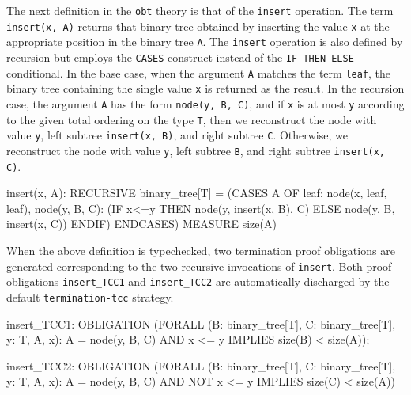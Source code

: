 \documentclass[11pt,twoside]{book}
\begin{document}
The next definition in the \texttt{obt} theory is that of the \texttt{insert} operation.  The term \texttt{insert(x, A)} returns that binary
tree obtained by inserting the value \texttt{x} at the
appropriate position in the binary tree \texttt{A}.  The \texttt{insert} operation is also defined by 
recursion but employs the \texttt{CASES} construct instead of the
\texttt{IF-THEN-ELSE} conditional.  In the base case, when the argument \texttt{A}
matches the term \texttt{leaf}, the binary tree containing the
single value \texttt{x} is returned as the result.  In the recursion case,
the argument \texttt{A} has the form \texttt{node(y, B, C)}, and
if \texttt{x} is at most \texttt{y} according to the given total ordering on
the type \texttt{T}, then we reconstruct the node with value \texttt{y},
left subtree \texttt{insert(x, B)}, and right subtree \texttt{C}\@.
Otherwise, we reconstruct the node with value \texttt{y}, left subtree
\texttt{B}, and right subtree \texttt{insert(x, C)}\@.
\begin{session*}
insert(x, A): RECURSIVE binary_tree[T] =
  (CASES A OF
    leaf: node(x, leaf, leaf),
    node(y, B, C): (IF x<=y THEN node(y, insert(x, B), C)
                            ELSE node(y, B, insert(x, C))
                    ENDIF)
   ENDCASES)
  MEASURE size(A)
\end{session*}

When the above definition is typechecked, two termination proof
obligations are generated corresponding to the two recursive
invocations of \texttt{insert}.  Both proof obligations \texttt{insert\_TCC1}
and \texttt{insert\_TCC2} are automatically discharged by the default
\texttt{termination-tcc} strategy.  
\begin{session*}
insert_TCC1: OBLIGATION
      (FORALL (B: binary_tree[T], C: binary_tree[T], y: T, A, x):
         A = node(y, B, C) AND x <= y IMPLIES size(B) < size(A));

insert_TCC2: OBLIGATION
      (FORALL (B: binary_tree[T], C: binary_tree[T], y: T, A, x):
         A = node(y, B, C) AND NOT x <= y IMPLIES size(C) < size(A))
\end{session*}

\end{document}
